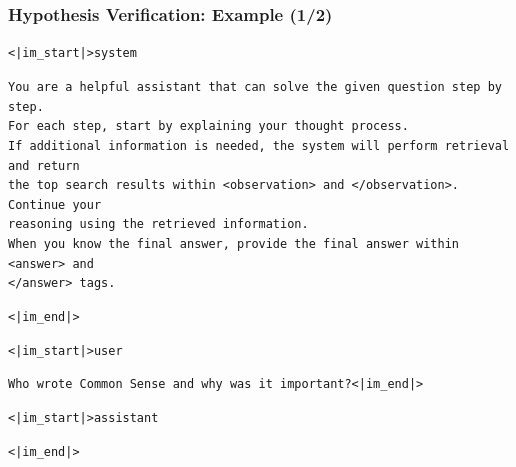 \begin{frame}[t]
    \frametitle{Hypothesis Verification: Example (1/2)}

    \scriptsize

    \texttt{<|im\_start|>system}

    \texttt{You are a helpful assistant that can solve the given question step by step.}\\
    \texttt{For each step, start by explaining your thought process.}\\
    \texttt{If additional information is needed, the system will perform retrieval and return}\\
    \texttt{the top search results within <observation> and </observation>. Continue your}\\
    \texttt{reasoning using the retrieved information.}\\
    \texttt{When you know the final answer, provide the final answer within <answer> and}\\
    \texttt{</answer> tags.}

    \texttt{<|im\_end|>}

    \vspace{0.1cm}

    \texttt{<|im\_start|>user}

    \texttt{Who wrote Common Sense and why was it important?<|im\_end|>}

    \vspace{0.1cm}

    \texttt{<|im\_start|>assistant}

    \texttt{<|im\_end|>}

\end{frame}



